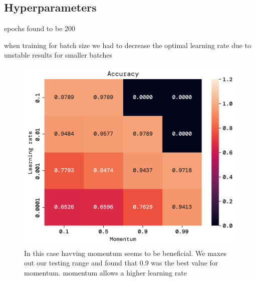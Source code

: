 \documentclass[twoside,11pt]{report}
\begin{document}
\subsection{Hyperparameters}
\label{sec:hyperparameters}
epochs found to be 200 

when training for batch size we had to decrease the optimal learning rate due to unstable results for smaller batches

\begin{figure}[!ht]
    \begin{minipage}[t]{0.5\textwidth - 1mm}
        \begin{center}
            \includegraphics[width=\textwidth]{../runsAndFigures/accuracy_lr_gamma.png}
        \end{center}
        \caption{In this case havving momentum seems to be beneficial. We maxes out our testing range and found that 0.9 was the best value for momentum. momentum allows a higher learning rate}\label{fig:accuracy_lr_gamma}
    \end{minipage}
    \hspace{2mm}
    \begin{minipage}[t]{0.5\textwidth - 1mm}
        \begin{center}

\end{center}
\end{minipage}
\end{figure}
\end{document}
